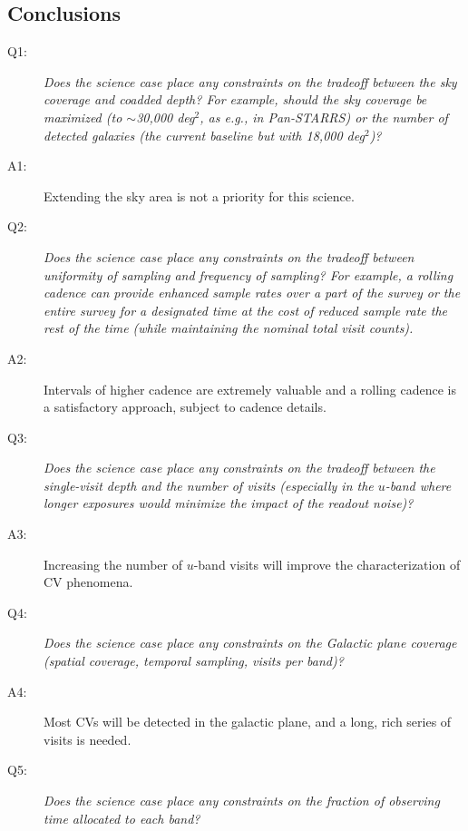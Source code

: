 \subsection{Conclusions}
%
%
 \begin{description}

 \item[Q1:] {\it Does the science case place any constraints on the
 tradeoff between the sky coverage and coadded depth? For example, should
 the sky coverage be maximized (to $\sim$30,000 deg$^2$, as e.g., in
 Pan-STARRS) or the number of detected galaxies (the current baseline but
 with 18,000 deg$^2$)?}

 \item[A1:] Extending the sky area is not a priority for this science.

 \item[Q2:] {\it Does the science case place any constraints on the
 tradeoff between uniformity of sampling and frequency of  sampling? For
 example, a rolling cadence can provide enhanced sample rates over a part
 of the survey or the entire survey for a designated time at the cost of
 reduced sample rate the rest of the time (while maintaining the nominal
 total visit counts).}

 \item[A2:] Intervals of higher cadence are extremely valuable and a rolling cadence is a
satisfactory approach, subject to cadence details.

 \item[Q3:] {\it Does the science case place any constraints on the
 tradeoff between the single-visit depth and the number of visits
 (especially in the $u$-band where longer exposures would minimize the
 impact of the readout noise)?}

 \item[A3:] Increasing the number of $u$-band visits will improve the characterization of CV phenomena.

 \item[Q4:] {\it Does the science case place any constraints on the
 Galactic plane coverage (spatial coverage, temporal sampling, visits per
 band)?}

 \item[A4:] Most CVs will be detected in the galactic plane, and a long, rich series of visits is needed.

 \item[Q5:] {\it Does the science case place any constraints on the
 fraction of observing time allocated to each band?}


\end{description}
